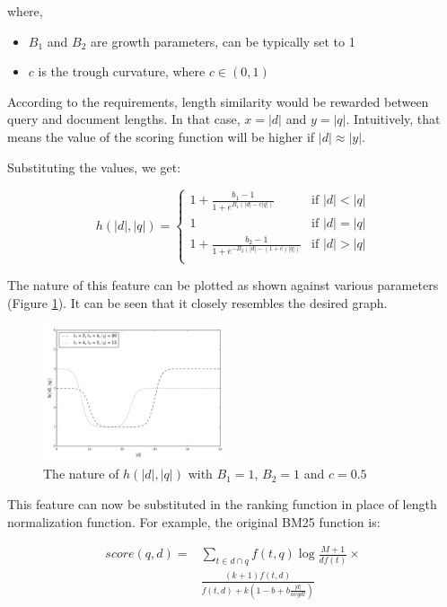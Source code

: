\documentclass[11pt]{article}
\begin{document}
	where,
	
	\begin{itemize}
		\item $B_1$ and $B_2$ are growth parameters, can be typically set to 1
		\item $c$ is the trough curvature, where $c \in (0, 1)$
	\end{itemize}
	
	According to the requirements, length similarity would be rewarded between query and document lengths. In that case, $x = |d|$ and $y = |q|$. Intuitively, that means the value of the scoring function will be higher if $|d| \approx |y|$.
	
	Substituting the values, we get:
	
	\begin{equation}
		h(|d|, |q|) = 
		\begin{cases}
			1 + \frac{b_1 - 1}{1 + e^{B_1(|d| - c|q|)}}       & \text{if } |d| < |q|\\
			1 &  \text{if } |d| = |q|\\
			1 + \frac{b_2 - 1}{1 + e^{-B_2(|d| - (1 + c)|q|)}}  &  \text{if } |d| > |q|\\
		\end{cases}
	\end{equation}
	
	The nature of this feature can be plotted as shown against various parameters (Figure \ref{nature}). It can be seen that it closely resembles the desired graph.
	
	\begin{figure}[h]
		\centering
		\includegraphics[width=0.48\textwidth]{test.pdf}
		\caption{The nature of $h(|d|, |q|)$ with $B_1 = 1$, $B_2 = 1$ and $c = 0.5$}
		\label{nature}
	\end{figure}
	
	This feature can now be substituted in the ranking function in place of length normalization function. For example, the original BM25 function is:
	
	\begin{align*}
		score(q, d) = & \sum_{t \in d \cap q} f(t, q) \log \frac{M + 1}{df(t)} \times \\
		& \frac{ (k + 1) f (t, d) }{f(t, d) + k \left( 1 - b + b \frac{|d|}{avgdl} \right)} 
	\end{align*}
	
\end{document}
